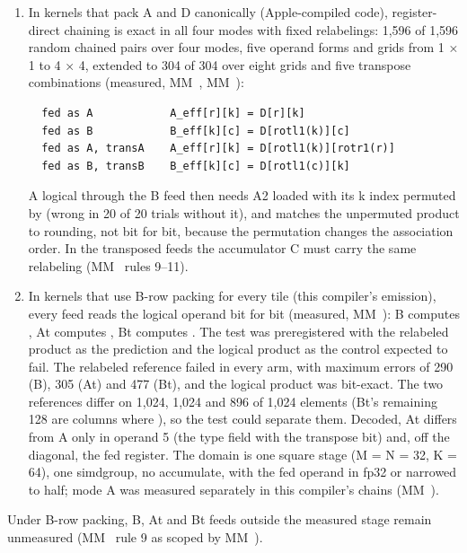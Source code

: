 \begin{enumerate}
\def\labelenumi{\arabic{enumi}.}
\item In kernels that pack A and D canonically (Apple-compiled  code), register-direct chaining is
  exact in all four modes with fixed relabelings: 1,596 of 1,596 random chained pairs over four modes, five operand
  forms and grids from 1 × 1 to 4 × 4, extended to 304 of 304 over eight grids and five transpose combinations (measured,
  MM~, MM~):

  \begin{lstlisting}
  fed as A            A_eff[r][k] = D[r][k]
  fed as B            B_eff[k][c] = D[rotl1(k)][c]
  fed as A, transA    A_eff[r][k] = D[rotl1(k)][rotr1(r)]
  fed as B, transB    B_eff[k][c] = D[rotl1(c)][k]
  \end{lstlisting}

  A logical  through the B feed then needs A2 loaded with its k index permuted by  (wrong in 20 of 20
  trials without it), and matches the unpermuted product to rounding, not bit for bit, because the permutation changes
  the association order. In the transposed feeds the accumulator C must carry the same relabeling (MM~ rules 9–11).
\item In kernels that use B-row packing for every tile (this compiler's  emission), every feed reads the
  logical operand bit for bit (measured, MM~): B computes , At computes , Bt computes
  . The test was preregistered with the relabeled product as the prediction and the logical
  product as the control expected to fail. The relabeled reference failed in every arm, with maximum errors of 290 (B), 305 (At) and 477 (Bt), and the logical product was bit-exact. The two references differ on
  1,024, 1,024 and 896 of 1,024 elements (Bt's remaining 128 are columns where ), so the test could
  separate them. Decoded, At differs from A only in operand 5 (the type field with the transpose bit) and, off the
  diagonal, the fed register. The domain is one square stage (M = N = 32, K = 64), one simdgroup, no accumulate, with
  the fed operand in fp32 or narrowed to half; mode A was measured separately in this compiler's chains (MM~).
\end{enumerate}

Under B-row packing, B, At and Bt feeds outside the measured stage remain unmeasured (MM~ rule 9 as scoped
by MM~).

